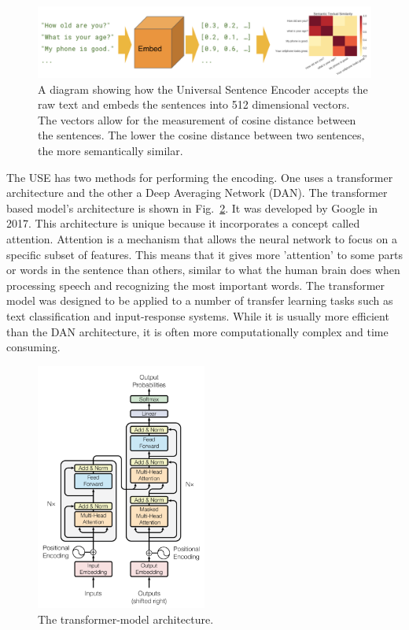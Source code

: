 \begin{figure}[htbp]
  \centering
    \includegraphics[width=1.0\textwidth]{figures/USEDiagram.pdf}
    \caption[A diagram showing how the Universal Sentence Encoder accepts the raw text and embeds the sentences into 512 dimensional vectors]{
    A diagram showing how the Universal Sentence Encoder accepts the raw text and embeds the sentences into 512 dimensional vectors. The vectors allow for the measurement of cosine distance between the sentences. The lower the cosine distance between two sentences, the more semantically similar.
    }
\label{fig:USEDiagram}
\end{figure}


The USE has two methods for performing the encoding. One uses a transformer architecture and the other a Deep Averaging Network (DAN). The transformer based model’s architecture is shown in Fig.~\ref{fig:Transformer}. It was developed by Google in 2017. This architecture is unique because it incorporates a concept called attention. Attention is a mechanism that allows the neural network to focus on a specific subset of features. This means that it gives more 'attention' to some parts or words in the sentence than others, similar to what the human brain does when processing speech and recognizing the most important words. The transformer model was designed to be applied to a number of transfer learning tasks such as text classification and input-response systems. While it is usually more efficient than the DAN architecture, it is often more computationally complex and time consuming.

\begin{figure}[htbp]
  \centering
    \includegraphics[width=0.5\textwidth]{figures/Transformer.pdf}
    \caption{
  The transformer-model architecture.
    }
\label{fig:Transformer}
\end{figure}

